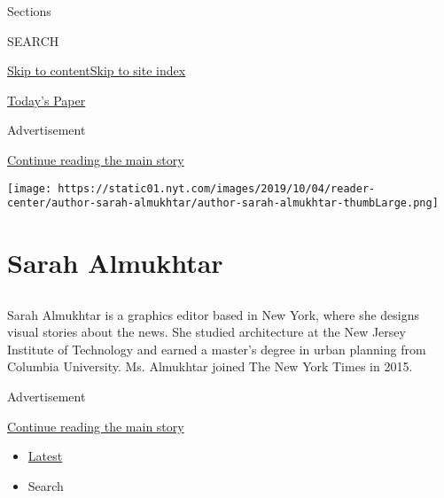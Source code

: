 Sections

SEARCH

\protect\hyperlink{site-content}{Skip to
content}\protect\hyperlink{site-index}{Skip to site index}

\href{https://myaccount.nytimes.com/auth/login?response_type=cookie\&client_id=vi}{}

\href{https://www.nytimes.com/section/todayspaper}{Today's Paper}

Advertisement

\protect\hyperlink{after-top}{Continue reading the main story}

\texttt{[image: https://static01.nyt.com/images/2019/10/04/reader-center/author-sarah-almukhtar/author-sarah-almukhtar-thumbLarge.png]}

\hypertarget{sarah-almukhtar}{%
\section{Sarah Almukhtar}\label{sarah-almukhtar}}

\subsection{}

Sarah Almukhtar is a graphics editor based in New York, where she
designs visual stories about the news. She studied architecture at the
New Jersey Institute of Technology and earned a master's degree in urban
planning from Columbia University. Ms. Almukhtar joined The New York
Times in 2015.

Advertisement

\protect\hyperlink{after-mid1}{Continue reading the main story}

\begin{itemize}
\tightlist
\item
  \protect\hyperlink{stream-panel}{Latest}
\item
  Search
\end{itemize}

